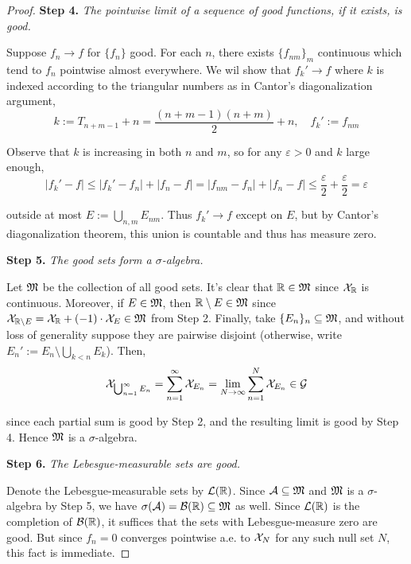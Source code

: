 \begin{proof}
    \textbf{Step 4.} \textit{The pointwise limit of a sequence of good functions, if it exists, is good.}

    Suppose \(f_n \to f\) for \(\{f_n\}\) good. For each \(n\), there exists \(\{f_{nm}\}_m\) continuous which tend to \(f_n\) pointwise almost everywhere. We wil show that \(f_k' \to f\) where \(k\) is indexed according to the triangular numbers as in Cantor's diagonalization argument, 
    \[
    k := T_{n+m-1} + n = \frac{(n+m-1)(n+m)}{2} + n, 
    \quad 
    f_k' := f_{nm}
    \]
    
    Observe that \(k\) is increasing in both \(n\) and \(m\), so for any \(\varepsilon > 0\) and \(k\) large enough, 
    \[
    |f_k' - f| 
    \leq |f_k' - f_n| + |f_n - f|
    = |f_{nm} - f_n| + |f_n - f|
    \leq \frac{\varepsilon}{2} + \frac{\varepsilon}{2}
    = \varepsilon
    \]

    outside at most \(E := \bigcup_{n,m} E_{nm}\). Thus \(f_k' \to f\) except on \(E\), but by Cantor's diagonalization theorem, this union is countable and thus has measure zero. 

    \textbf{Step 5.} \textit{The good sets form a \(\sigma\)-algebra.}

    Let \(\mathfrak{M}\) be the collection of all good sets. It's clear that \(\mathbb{R} \in \mathfrak{M}\) since \(\mathcal{X}_{\mathbb{R}}\) is continuous. Moreover, if \(E \in \mathfrak{M}\), then \(\mathbb{R} \setminus E \in \mathfrak{M}\) since \(\mathcal{X}_{\mathbb{R} \setminus E} = \mathcal{X}_{\mathbb{R}} + (-1) \cdot \mathcal{X}_E \in \mathfrak{M}\) from Step 2. Finally, take \(\{E_n\}_n \subseteq \mathfrak{M}\), and without loss of generality suppose they are pairwise disjoint (otherwise, write \(E_n' := E_n \setminus \bigcup_{k<n}E_k\)). Then, 
    \[
    \mathcal{X}_{\bigcup_{n=1}^\infty E_n} 
    = \sum_{n=1}^\infty \mathcal{X}_{E_n} 
    = \lim_{N \to \infty} \sum_{n=1}^N \mathcal{X}_{E_n}
    \in \mathcal{G}
    \]

    since each partial sum is good by Step 2, and the resulting limit is good by Step 4. Hence \(\mathfrak{M}\) is a \(\sigma\)-algebra. 

    \textbf{Step 6.} \textit{The Lebesgue-measurable sets are good.}

    Denote the Lebesgue-measurable sets by \(\mathcal{L}(\mathbb{R})\). Since \(\mathcal{A} \subseteq \mathfrak{M}\) and \(\mathfrak{M}\) is a \(\sigma\)-algebra by Step 5, we have \(\sigma(\mathcal{A}) = \mathcal{B}(\mathbb{R}) \subseteq \mathfrak{M}\) as well. Since \(\mathcal{L}(\mathbb{R})\) is the completion of \(\mathcal{B}(\mathbb{R})\), it suffices that the sets with Lebesgue-measure zero are good. But since \(f_n = 0\) converges pointwise a.e. to \(\mathcal{X}_N\) for any such null set \(N\), this fact is immediate. 


\end{proof}
